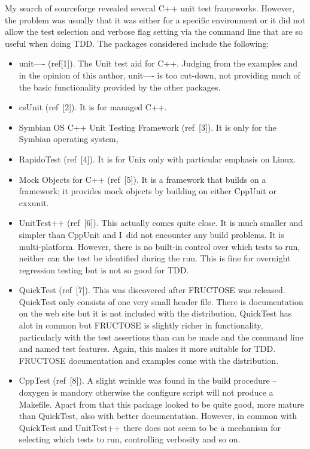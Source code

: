 \documentclass{book}
\begin{document}
My search of sourceforge revealed several C++ unit test
frameworks. However, the problem was usually that it was
either for a specific environment or it did not allow the 
test selection and verbose flag setting via the command line
that are so useful when doing TDD.
The packages considered include the following:
\begin{itemize}
\item unit---- (ref[1]).
The Unit test aid for C++.
Judging from the examples and in the opinion of this author, unit----
is too cut-down, not providing much of the basic functionality
provided by the other packages.

\item csUnit (ref~[2]). It is for managed C++.

\item Symbian OS C++ Unit Testing Framework (ref~[3]).
It is only for the Symbian operating system,

\item RapidoTest (ref~[4]).
It is for Unix only with particular emphasis on Linux.

\item Mock Objects for C++ (ref~[5]).
It is a framework that builds on a framework; it 
provides mock objects by building on either CppUnit or cxxunit.

\item UnitTest++ (ref~[6]).
This actually comes quite close.
It is much smaller and simpler than CppUnit and I~did not
encounter any build problems. It is multi-platform.
However, there is no built-in control over which tests
to run, neither can the test be identified during the run.
This is fine for overnight regression testing but is not
so good for TDD.

\item QuickTest (ref~[7]).
This was discovered after FRUCTOSE was released.
QuickTest only consists of one very small header file.
There is documentation on the web site but it is not included with the distribution.
QuickTest has alot in common but FRUCTOSE is slightly richer in functionality,
particularly with the test assertions than can be made and the
command line and named test features. 
Again, this makes it more suitable for TDD.
FRUCTOSE documentation and examples come with the distribution.

\item CppTest (ref~[8]).
A slight wrinkle was found in the build procedure -- doxygen is mandory
otherwise the configure script will not produce a Makefile.
Apart from that this package looked to be quite good, more mature
than QuickTest, also with better documentation.
However, in common with QuickTest and UnitTest++ there does not
seem to be a mechanism for selecting which tests to run,
controlling verbosity and so on.


\end{itemize}
\end{document}
